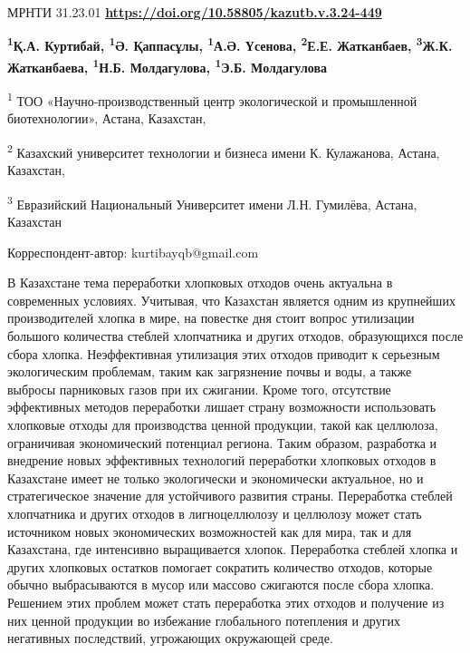 \newpage
МРНТИ 31.23.01
\hfill {\bfseries \href{https://doi.org/10.58805/kazutb.v.3.24-449}{https://doi.org/10.58805/kazutb.v.3.24-449}}


\begin{center}
{\bfseries \textsuperscript{1}Қ.А. Куртибай\envelope, \textsuperscript{1}Ә. Қаппасұлы, \textsuperscript{1}А.Ә. Үсенова, \textsuperscript{2}Е.Е. Жатканбаев, \textsuperscript{3}Ж.К. Жатканбаева, \textsuperscript{1}Н.Б. Молдагулова, \textsuperscript{1}Э.Б. Молдагулова}

\textsuperscript{1} ТОО «Научно-производственный центр экологической и
промышленной биотехнологии», Астана, Казахстан,

\textsuperscript{2} Казахский университет технологии и бизнеса имени К.
Кулажанова, Астана, Казахстан,

\textsuperscript{3} Евразийский Национальный Университет имени Л.Н.
Гумилёва, Астана, Казахстан
\end{center}
\envelope Корреспондент-автор: kurtibayqb@gmail.com


В Казахстане тема переработки хлопковых отходов очень актуальна в
современных условиях. Учитывая, что Казахстан является одним из
крупнейших производителей хлопка в мире, на повестке дня стоит вопрос
утилизации большого количества стеблей хлопчатника и других отходов,
образующихся после сбора хлопка. Неэффективная утилизация этих отходов
приводит к серьезным экологическим проблемам, таким как загрязнение
почвы и воды, а также выбросы парниковых газов при их сжигании. Кроме
того, отсутствие эффективных методов переработки лишает страну
возможности использовать хлопковые отходы для производства ценной
продукции, такой как целлюлоза, ограничивая экономический потенциал
региона. Таким образом, разработка и внедрение новых эффективных
технологий переработки хлопковых отходов в Казахстане имеет не только
экологически и экономически актуальное, но и стратегическое значение для
устойчивого развития страны. Переработка стеблей хлопчатника и других
отходов в лигноцеллюлозу и целлюлозу может стать источником новых
экономических возможностей как для мира, так и для Казахстана, где
интенсивно выращивается хлопок. Переработка стеблей хлопка и других
хлопковых остатков помогает сократить количество отходов, которые обычно
выбрасываются в мусор или массово сжигаются после сбора хлопка. Решением
этих проблем может стать переработка этих отходов и получение из них
ценной продукции во избежание глобального потепления и других негативных
последствий, угрожающих окружающей среде.

